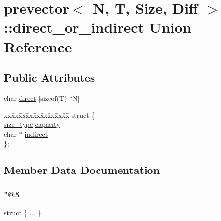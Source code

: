 \hypertarget{unionprevector_1_1direct__or__indirect}{}\section{prevector$<$ N, T, Size, Diff $>$\+:\+:direct\+\_\+or\+\_\+indirect Union Reference}
\label{unionprevector_1_1direct__or__indirect}
\subsection*{Public Attributes}
\begin{DoxyCompactItemize}
\item 
char \mbox{\hyperlink{unionprevector_1_1direct__or__indirect_accf7da4788eeb76fff71273789bb78e5}{direct}} \mbox{[}sizeof(T) $\ast$N\mbox{]}
\item 
\begin{tabbing}
xx\=xx\=xx\=xx\=xx\=xx\=xx\=xx\=xx\=\kill
struct \{\\
\>\mbox{\hyperlink{classprevector_a7e0da95e6d1c878f6eeb572f4fc12524}{size\_type}} \mbox{\hyperlink{unionprevector_1_1direct__or__indirect_a8620e32f60f8c5ff1b91665093d6bf91}{capacity}}\\
\>char $\ast$ \mbox{\hyperlink{unionprevector_1_1direct__or__indirect_a1c80825c1780b32f20caf1b098a17557}{indirect}}\\
\}; \\

\end{tabbing}\end{DoxyCompactItemize}


\subsection{Member Data Documentation}
\mbox{\label{unionprevector_1_1direct__or__indirect_ae2661bd2bfa1451538b79f293c897a42}} 
\subsubsection{\texorpdfstring{"@5}{@5}}
{\footnotesize\ttfamily struct \{ ... \} }

\mbox{\label{unionprevector_1_1direct__or__indirect_a8620e32f60f8c5ff1b91665093d6bf91}} 
